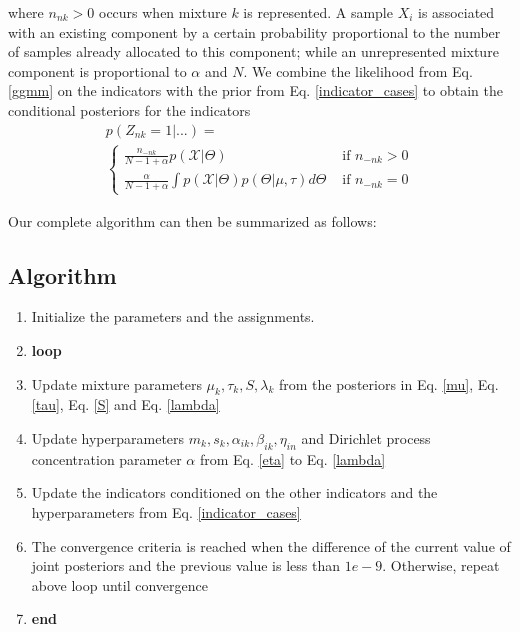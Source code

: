 \documentclass[letterpaper]{article}
\begin{document}
        where $n_{nk}>0$ occurs when mixture $k$ is represented. A sample
        $X_i$ is associated with an existing component by a certain probability
        proportional to the number of samples already allocated to this component;
        while an unrepresented mixture component is proportional to $\alpha$ and $N$.
        We combine the likelihood from Eq. \ref{ggmm} on the indicators with the prior from
        Eq. \ref{indicator_cases} to obtain the conditional posteriors for the indicators
        \begin{equation}
            \begin{split}
                p(Z_{nk} = 1| ...)= \\
                \begin{cases}
                    \frac{n_{-nk}}{N -1 +\alpha}p(\mathcal{X}|\Theta) &\text{     if     } n_{-nk}>0\\ 
                    \frac{\alpha}{N -1 +\alpha}\int p(\mathcal{X}|\Theta) p(\Theta|\mu, \tau)d\Theta &\text{     if     } n_{-nk}=0
                \end{cases}    
            \end{split}
            \label{indicator_cases}
        \end{equation}
        
        Our complete algorithm can then be summarized as follows:         
\subsection*{\textbf{Algorithm}}
\begin{enumerate}
    \item Initialize the parameters and the assignments.
    \item \textbf{loop}
    \item Update mixture parameters $\mu_k, \tau_k, S,\lambda_k$ from the posteriors in Eq. \ref{mu}, Eq. \ref{tau}, Eq. \ref{S} and Eq. \ref{lambda}
    \item Update hyperparameters $m_k, s_k, \alpha_{ik}, \beta_{ik} ,\eta_{in} $ and Dirichlet process concentration parameter $\alpha$ from Eq. \ref{eta} to Eq. \ref{lambda}
    \item Update the indicators conditioned on the other indicators and the hyperparameters from Eq. \ref{indicator_cases}
    \item The convergence criteria is reached when the difference of the current value of
    joint posteriors and the previous value is less than $1e-9$. Otherwise, repeat above
    loop until convergence
    \item \textbf{end}
\end{enumerate}
\end{document}

